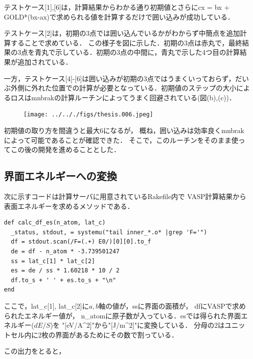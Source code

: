 テストケース{[}1{]},{[}6{]}は，計算結果からわかる通り初期値とさらにcx =
bx + GOLD*(bx-ax)で求められる値を計算するだけで囲い込みが成功している．

テストケース{[}2{]}は，初期の3点では囲い込んでいるかがわからず中簡点を追加計算することで求めている．
この様子を図に示した．初期の3点は赤丸で，最終結果の3点を青丸で示している．初期の3点の中間に，青丸で示した4つ目の計算結果が追加されている．

一方，テストケース{[}4{]}-{[}6{]}は囲い込みが初期の3点ではうまくいっておらず，だいぶ外側に外れた位置での計算が必要となっている．初期値のステップの大小によるロスはmnbrakの計算ルーチンによってうまく回避されている(図(b),(c))．

\begin{figure}[H]
\centering
\begin{center}
\texttt{[image: ../.././figs/thesis.006.jpeg]}
\end{center}
\caption{{}}

\label{fig:}
\end{figure}

初期値の取り方を間違うと最大6になるが，
概ね，囲い込みは効率良くmnbrakによって可能であることが確認できた．
そこで，このルーチンをそのまま使ってこの後の開発を進めることとした．

    \subsection{界面エネルギーへの変換}\label{ux754cux9762ux30a8ux30cdux30ebux30aeux30fcux3078ux306eux5909ux63db}

次に示すコードは計算サーバに用意されているRakefile内で
VASP計算結果から表面エネルギーを求めるメソッドである．

\begin{verbatim}
def calc_df_es(n_atom, lat_c)
  _status, stdout, = systemu("tail inner_*.o* |grep 'F='")
  df = stdout.scan(/F=(.+) E0/)[0][0].to_f
  de = df - n_atom * -3.739501247
  ss = lat_c[1] * lat_c[2]
  es = de / ss * 1.60218 * 10 / 2
  df.to_s + ' ' + es.to_s + "\n"
end
\end{verbatim}

ここで，lat\_c{[}1{]},
lat\_c{[}2{]}に\(a,b\)軸の値が，ssに界面の面積が，
dfにVASPで求められたエネルギー値が，
n\_atomに原子数が入っている．esでは得られた界面エネルギー(\(dE/S\))を
"{[}eV/A\^{}2{]}"から"{[}J/m\^{}2{]}"に変換している．
分母の2はユニットセル内に2枚の界面があるためにその数で割っている．

この出力をとると，

